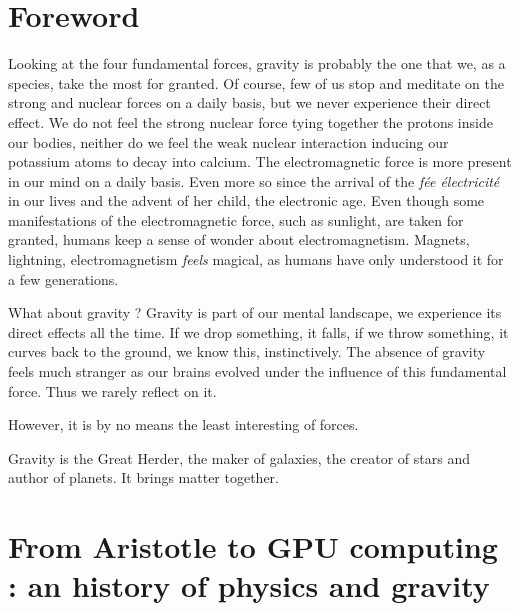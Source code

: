 



\section*{Foreword}

Looking at the four fundamental forces, gravity is probably the one that we, as a species, take the most for granted. Of course, few of us stop and meditate on the strong and nuclear forces on a daily basis, but we never experience their direct effect. We do not feel the strong nuclear force tying together the protons inside our bodies,  neither do we feel the weak nuclear interaction inducing our potassium atoms to decay into calcium. The electromagnetic force is more present in our mind on a daily basis. Even more so since the arrival of the \textit{f\'ee \'electricit\'e} in our lives and the advent of her child, the electronic age. Even though some manifestations of the electromagnetic force, such as sunlight, are taken for granted, humans keep a sense of wonder about electromagnetism. Magnets, lightning, electromagnetism \textit{feels} magical, as humans have only understood it for a few generations.

What about gravity ? Gravity is part of our mental landscape, we experience its direct effects all the time. If we drop something, it falls, if we throw something, it curves back to the ground, we know this, instinctively. The absence of gravity feels much stranger as our brains evolved under the influence of this fundamental force. Thus we rarely reflect on it. 

However, it is by no means the least interesting of forces.
 
Gravity is the Great Herder, the maker of galaxies, the creator of stars and author of planets. It brings matter together.  

\newpage


\section{From Aristotle to GPU computing : an history of physics and gravity}

